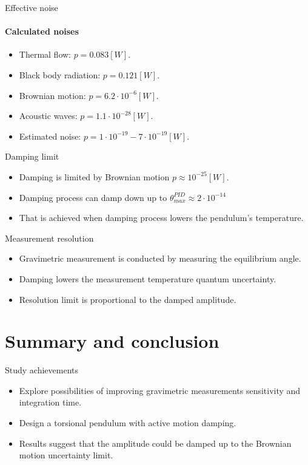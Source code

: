 \documentclass{beamer}
\begin{document}
\begin{frame}{Effective noise}
	\framesubtitle{Calculated noises}
	\begin{itemize}	
		\item Thermal flow: $p=0.083[W]$.
		\item Black body radiation: $p=0.121[W]$.
		\item Brownian motion: $p=6.2\cdot 10^{-6}[W]$.
		\item Acoustic waves: $p=1.1\cdot 10^{-28}[W]$.
		\pause
		\item Estimated noise: $p=1\cdot 10^{-19} - 7\cdot 10^{-19}[W]$.
					
	\end{itemize}
\end{frame}
\begin{frame}{Damping limit}
	
	\begin{itemize}	 
		\item Damping is limited by Brownian motion $p\approx 10^{-25}  [W]$.
		\item Damping process can damp down up to $\theta_{max}^{PID}\approx 2\cdot 10^{-14}$
		\item That is achieved when damping process lowers the pendulum's temperature.  				
	\end{itemize}
\end{frame}
\begin{frame}{Measurement resolution}
	
	\begin{itemize}	 
		\item Gravimetric measurement is conducted by measuring the equilibrium angle.
		\item Damping lowers the measurement temperature quantum uncertainty.
		\item Resolution limit is proportional to the damped amplitude. 				
	\end{itemize}
\end{frame}

\section{Summary and conclusion}
\begin{frame}{Study achievements}
	\begin{itemize}
		
		
		\item Explore possibilities of improving gravimetric measurements sensitivity and integration time. 
		\item Design a torsional pendulum with active motion damping. 
		\pause
		\item Results suggest that the amplitude could be damped up to the Brownian motion uncertainty limit. 
		
		
	\end{itemize}
\end{frame}
\end{document}

